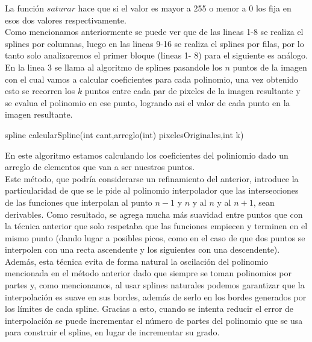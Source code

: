 La función $saturar$ hace que si el valor es mayor a 255 o menor a 0 los fija en esos dos valores respectivamente.\\
Como mencionamos anteriormente se puede ver que de las lineas 1-8 se realiza el splines por columnas, luego en las lineas 9-16 se realiza el splines por filas, por lo tanto solo analizaremos el primer bloque (lineas 1- 8) para el siguiente es análogo.\\
En la linea 3 se llama al algoritmo de splines pasandole los $n$ puntos de la imagen con el cual vamos a calcular coeficientes para cada polinomio, una vez obtenido esto se recorren los $k$ puntos entre cada par de pixeles de la imagen resultante y se evalua el polinomio en ese punto, logrando asi el valor de cada punto en la imagen resultante. 
\begin{algorithm}
\begin{algorithmic}[1]\parskip=1mm
\caption{spline calcularSpline(int cant,arreglo(int) pixelesOriginales,int k)}
  \STATE{\quad$ (cs_{i} + 1] - cs[i]) / (3 * k)$}
\end{algorithmic}
\end{algorithm}

En este algoritmo \cite{burden} estamos calculando los coeficientes del poliniomio dado un arreglo de elementos que van a ser nuestros puntos.\\

Este método, que podría considerarse un refinamiento del anterior, introduce la particularidad de que se le pide al polinomio interpolador que las intersecciones de las funciones que interpolan al punto $n-1$ y $n$ y al $n$ y al $n+1$, sean derivables. Como resultado, se agrega mucha más suavidad entre puntos que con la técnica anterior que solo respetaba que las funciones empiecen y terminen en el mismo punto (dando lugar a posibles picos, como en el caso de que dos puntos se interpolen con una recta ascendente y los siguientes con una descendente). Además, esta técnica evita de forma natural la oscilación del polinomio mencionada en el método anterior dado que siempre se toman polinomios por partes y, como mencionamos, al usar splines naturales podemos garantizar que la interpolación es suave en sus bordes, además de serlo en los bordes generados por los límites de cada spline. Gracias a esto, cuando se intenta reducir el error de interpolación se puede incrementar el número de partes del polinomio que se usa para construir el spline, en lugar de incrementar su grado.


